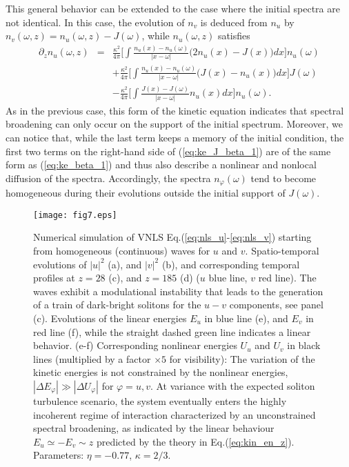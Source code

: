\documentclass[pra,twocolumn,showpacs,preprintnumbers,amsmath,amssymb]{revtex4}
\def\vfi{\varphi}
\begin{document}
This general behavior can be extended to the case where the initial spectra are not identical. In this case, the evolution of $n_v$ is deduced from $n_u$ by $n_v(\omega,z) =  n_u(\omega,z) - J(\omega)$, while $n_u(\omega,z)$ satisfies
\begin{eqnarray}
 \partial_z n_u(\omega,z) &=& \frac{\kappa^2}{4 \pi}
 \Big[ \int \frac{n_u(x)-n_u(\omega)}{|x-\omega|}  \big(2 n_u(x) - J(x) \big) dx \Big] n_u(\omega) \nonumber \\
&& +\frac{\kappa^2}{4 \pi}
 \Big[ \int \frac{n_u(x)-n_u(\omega)}{|x-\omega|}  \big( J(x) - n_u(x) \big) dx \Big] J(\omega)
\nonumber   \\
&& - \frac{\kappa^2}{4 \pi}
\Big[ \int \frac{J(x)-J(\omega)}{|x-\omega|} n_u(x) dx \Big] n_u(\omega).
\label{eq:ke_J_beta_1}
\end{eqnarray}
As in the previous case, this form of the kinetic equation indicates that spectral broadening can  only occur on the support of the initial spectrum. Moreover, we can notice that, while the last term keeps a memory of the initial condition, the first two terms on the right-hand side of (\ref{eq:ke_J_beta_1}) are of the same form as (\ref{eq:ke_beta_1}) and thus also describe a nonlinear and nonlocal diffusion of the spectra.
Accordingly, the spectra $n_\varphi(\omega)$ tend to become homogeneous during their evolutions outside the initial support of $J(\omega)$.



\begin{center}
\begin{figure}[t]
\texttt{[image: fig7.eps]}
\caption{Numerical simulation of VNLS Eq.(\ref{eq:nls_u}-\ref{eq:nls_v}) starting from homogeneous (continuous) waves for $u$ and $v$. 
Spatio-temporal evolutions of $|u|^2$ (a), and $|v|^2$ (b), and corresponding temporal profiles at $z=28$ (c), and $z=185$ (d) ($u$ blue line, $v$ red line).
The waves exhibit a modulational instability that leads to the generation of a train of dark-bright solitons for the $u-v$ components, see panel (c).
Evolutions of the linear energies $E_{u}$ in blue line (e), and $E_v$ in red line (f), while the straight dashed green line indicates a linear behavior.
(e-f) Corresponding nonlinear energies $U_{u}$ and $U_v$ in black lines  (multiplied by a factor $\times 5$ for visibility):
The variation of the kinetic energies is not constrained by the nonlinear energies, $|\Delta E_{\vfi}| \gg |\Delta U_{\vfi}|$ for $\vfi=u,v$.
At variance with the expected soliton turbulence scenario, the system eventually enters the highly incoherent regime of interaction characterized by an unconstrained spectral broadening, as indicated by the linear behaviour $E_{u} \simeq - E_v \sim z$ predicted by the theory in Eq.(\ref{eq:kin_en_z}).
Parameters: $\eta=-0.77$, $\kappa=2/3$.}
\label{fig:soliton_turb}
\end{figure}
\end{center}
\end{document}
